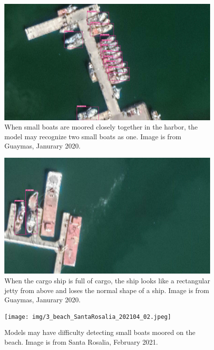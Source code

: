 \begin{figure}[t]
    \centering
    \includegraphics[width=\columnwidth]{img/1_docked_together_Guaymas_202001_20.jpeg}
    \caption{When small boats are moored closely together in the harbor, the model may recognize two small boats as one. Image is from Guaymas, Janurary 2020.}
    \label{fig:1_docked_together_Guaymas_202001_20}
\end{figure}

\begin{figure}[t]
    \includegraphics[width=\columnwidth]{img/2_square_Guaymas_202001_01.jpeg}
    \caption{When the cargo ship is full of cargo, the ship looks like a rectangular jetty from above and loses the normal shape of a ship. Image is from Guaymas, Janurary 2020.}
    \label{fig:2_square_Guaymas_202001_01}
\end{figure}

\begin{figure}[t]
    \texttt{[image: img/3\_beach\_SantaRosalia\_202104\_02.jpeg]}
    \caption{Models may have difficulty detecting small boats moored on the beach. Image is from Santa Rosalia, February 2021.}
    \label{fig:3_beach_SantaRosalia_202104_02}
\end{figure}



